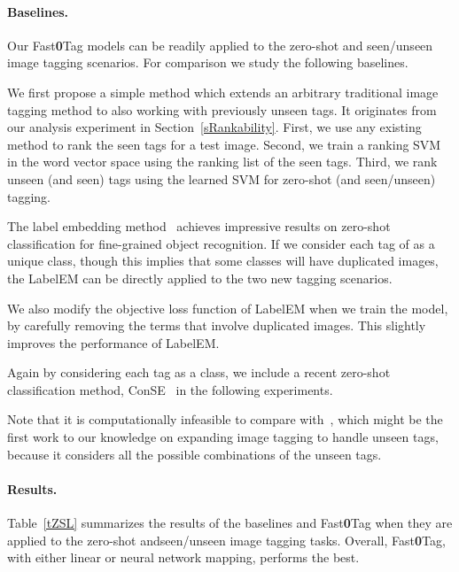 \documentclass[10pt,twocolumn,letterpaper]{article}
\newcommand{\ours}{{Fast\textbf{0}Tag}}
\begin{document}
\paragraph{Baselines.} Our {\ours} models can be readily applied to the  zero-shot and seen/unseen image tagging scenarios. For comparison we study the following baselines. 
\vspace{-5pt}
\begin{description}    \setlength\itemsep{-1pt}
\item[Seen2Unseen.] We first propose a simple method which  extends an arbitrary traditional image tagging method to also  working with previously unseen tags. It originates from our analysis experiment in Section~\ref{sRankability}. First, we use any existing method to rank the seen tags for a  test image. Second, we train a ranking SVM in the word vector space using the ranking list of the seen tags. Third, we rank unseen (and seen) tags using the learned SVM for zero-shot (and seen/unseen) tagging.
\item[LabelEM.] The label embedding method~\cite{akata_evaluation_2015} achieves impressive results on  zero-shot classification  for fine-grained object recognition. If we consider each tag of  as a unique class, though this implies that some classes will have duplicated images, the LabelEM can be directly applied to the two new tagging scenarios. 
\item[LabelEM+.] We also modify the objective loss function of LabelEM when we train the model, by carefully removing the terms that involve duplicated images.  This slightly improves the performance of LabelEM.
\item[ConSE.] Again by considering each tag as a class, we include a recent zero-shot classification method, ConSE~\cite{norouzi_zero-shot_2013} in the following experiments. 
\vspace{-4pt}
\end{description} 
Note that it is computationally infeasible to compare with~\cite{fu_transductive_2015}, which might be the first work to our knowledge on expanding image tagging to handle unseen tags, because it considers all the possible combinations of the unseen tags. \vspace{-24pt}

\paragraph{Results.} Table~\ref{tZSL} summarizes the results of the baselines and {\ours} when they are applied to  the zero-shot andseen/unseen image tagging tasks. Overall,  {\ours},  with  either  linear  or neural network mapping, performs the best. 
\end{document}
